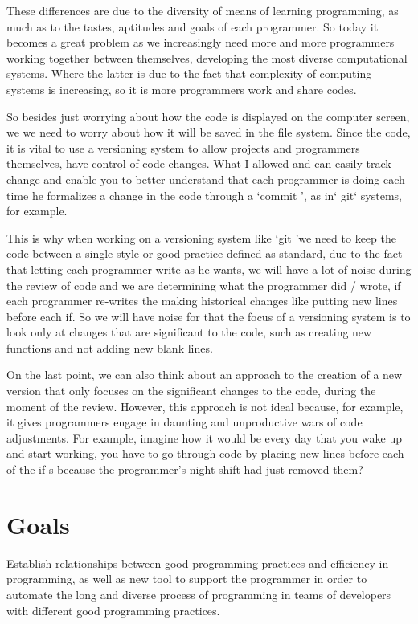 {    These differences are due to the diversity of means of learning programming, as much as
    to the tastes, aptitudes and goals of each programmer. So today it becomes a great
    problem as we increasingly need more and more programmers working together between
    themselves, developing the most diverse computational systems. Where the latter is due to the fact that
    complexity of computing systems is increasing, so it is
    more programmers work and share codes.

    So besides just worrying about how the code is displayed on the computer screen, we
    we need to worry about how it will be saved in the file system. Since the
    code, it is vital to use a versioning system to allow
    projects and programmers themselves, have control of code changes. What I allowed and
    can easily track change and enable you to better understand
    that each programmer is doing each time he formalizes a change in the code through
    a `commit ', as in` git` systems, for example.

    This is why when working on a versioning system like `git 'we need to keep the
    code between a single style or good practice defined as standard, due to the fact that
    letting each programmer write as he wants, we will have a lot of noise during the review of
    code and we are determining what the programmer did / wrote, if each programmer re-writes the
    making historical changes like putting new lines before each if. So we will have noise for
    that the focus of a versioning system is to look only at changes that are significant
    to the code, such as creating new functions and not adding new blank lines.

    On the last point, we can also think about an approach to the creation of a new
    version that only focuses on the significant changes to the code, during the moment of the
    review. However, this approach is not ideal because, for example, it gives
    programmers engage in daunting and unproductive wars of code adjustments. For example,
    imagine how it would be every day that you wake up and start working, you have to go through
    code by placing new lines before each of the if \textquotesingle s because the programmer's
    night shift had just removed them?

\section{Goals}

    Establish relationships between good programming practices and efficiency in programming, as well as
    new tool to support the programmer in order to automate the long and diverse process
    of programming in teams of developers with different good programming practices.


}

